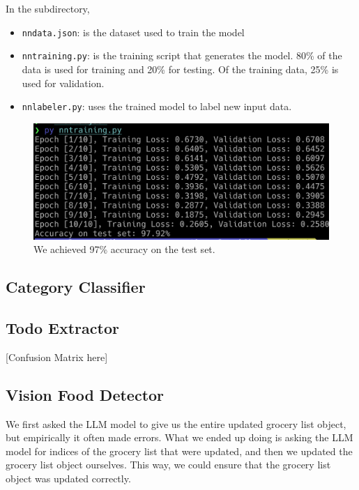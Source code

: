 \documentclass{article}
\begin{document}
In the subdirectory,
\begin{itemize}
 \item \texttt{nndata.json}: is the dataset used to train the model
  \item \texttt{nntraining.py}: is the training script that generates the model. 80\% of the data is used for training and 20\% for testing. Of the training data, 25\% is used for validation.
  \item \texttt{nnlabeler.py}: uses the trained model to label new input data.
\end{itemize}

\begin{figure}[htbp]
\centering
\includegraphics[width=\textwidth]{question_classifier_accuracy.png}
\caption{\small We achieved 97\% accuracy on the test set.}
\end{figure}

\subsection*{\color{draculayellow}Category Classifier}

\subsection*{\color{draculayellow}Todo Extractor}

[Confusion Matrix here]

\subsection*{\color{draculayellow}Vision Food Detector}

We first asked the LLM model to give us the entire updated grocery list object, but empirically it often made errors. What we ended up doing is asking the LLM model for indices of the grocery list that were updated, and then we updated the grocery list object ourselves. This way, we could ensure that the grocery list object was updated correctly.
\end{document}
